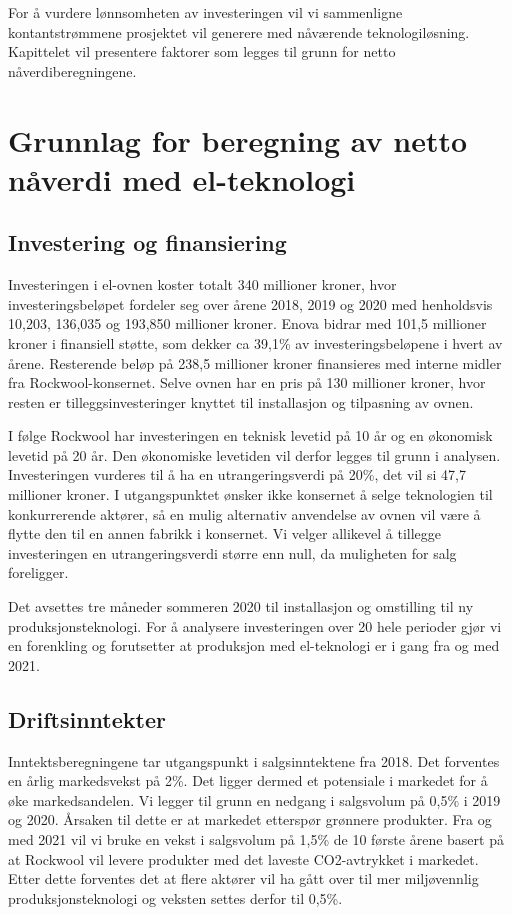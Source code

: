 For å vurdere lønnsomheten av investeringen vil vi sammenligne kontantstrømmene prosjektet vil generere med nåværende teknologiløsning. Kapittelet vil presentere faktorer som legges til grunn for netto nåverdiberegningene.

\section{Grunnlag for beregning av netto nåverdi med el-teknologi}
\subsection{ Investering og finansiering}
Investeringen i el-ovnen koster totalt 340 millioner kroner, hvor investeringsbeløpet fordeler seg over årene 2018, 2019 og 2020 med henholdsvis 10,203, 136,035 og 193,850 millioner kroner. Enova bidrar med 101,5 millioner kroner i finansiell støtte, som dekker ca 39,1\% av investeringsbeløpene i hvert av årene. Resterende beløp på 238,5 millioner kroner finansieres med interne midler fra Rockwool-konsernet. Selve ovnen har en pris på 130 millioner kroner, hvor resten er tilleggsinvesteringer knyttet til installasjon og tilpasning av ovnen. 

\indent \newline
I følge Rockwool har investeringen en teknisk levetid på 10 år og en økonomisk levetid på 20 år. Den økonomiske levetiden vil derfor legges til grunn i analysen. Investeringen vurderes til å ha en utrangeringsverdi på 20\%, det vil si 47,7 millioner kroner. I utgangspunktet ønsker ikke konsernet å selge teknologien til konkurrerende aktører, så en mulig alternativ anvendelse av ovnen vil være å flytte den til en annen fabrikk i konsernet. Vi velger allikevel å tillegge investeringen en utrangeringsverdi større enn null, da muligheten for salg foreligger. 

\indent \newline
Det avsettes tre måneder sommeren 2020 til installasjon og omstilling til ny produksjonsteknologi. For å analysere investeringen over 20 hele perioder gjør vi en forenkling og forutsetter at produksjon med el-teknologi er i gang fra og med 2021.

\subsection{Driftsinntekter}
Inntektsberegningene tar utgangspunkt i salgsinntektene fra 2018. Det forventes en årlig markedsvekst på 2\%. Det ligger dermed et potensiale i markedet for å øke markedsandelen. Vi legger til grunn en nedgang i salgsvolum på 0,5\% i 2019 og 2020. Årsaken til dette er at markedet etterspør grønnere produkter. Fra og med 2021 vil vi bruke en vekst i salgsvolum på 1,5\% de 10 første årene basert på at Rockwool vil levere produkter med  det laveste CO2-avtrykket i markedet. Etter dette forventes det at flere aktører vil ha gått over til mer miljøvennlig produksjonsteknologi og veksten settes derfor til 0,5\%.

